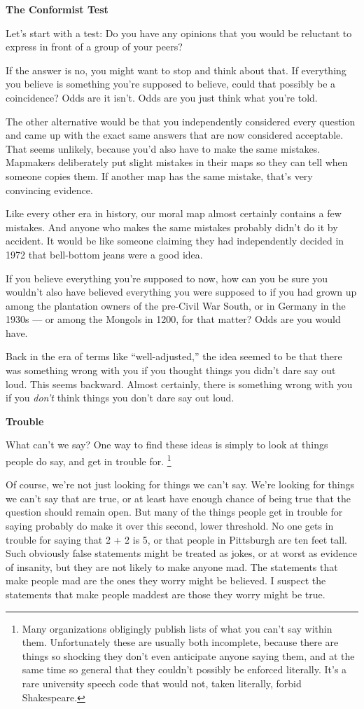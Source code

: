 \textbf{The Conformist Test}

Let's start with a test: Do you have any opinions that you would be
reluctant to express in front of a group of your peers?

If the answer is no, you might want to stop and think about that. If
everything you believe is something you're supposed to believe, could
that possibly be a coincidence? Odds are it isn't. Odds are you just
think what you're told.

The other alternative would be that you independently considered every
question and came up with the exact same answers that are now considered
acceptable. That seems unlikely, because you'd also have to make the
same mistakes. Mapmakers deliberately put slight mistakes in their maps
so they can tell when someone copies them. If another map has the same
mistake, that's very convincing evidence.

Like every other era in history, our moral map almost certainly contains
a few mistakes. And anyone who makes the same mistakes probably didn't
do it by accident. It would be like someone claiming they had
independently decided in 1972 that bell-bottom jeans were a good idea.

If you believe everything you're supposed to now, how can you be sure
you wouldn't also have believed everything you were supposed to if you
had grown up among the plantation owners of the pre-Civil War South, or
in Germany in the 1930s --- or among the Mongols in 1200, for that
matter? Odds are you would have.

Back in the era of terms like ``well-adjusted,'' the idea seemed to be
that there was something wrong with you if you thought things you didn't
dare say out loud. This seems backward. Almost certainly, there is
something wrong with you if you \emph{don't} think things you don't dare
say out loud.

\textbf{Trouble}

What can't we say? One way to find these ideas is simply to look at
things people do say, and get in trouble for. \footnote{Many organizations obligingly publish lists of what you can't
say within them. Unfortunately these are usually both incomplete,
because there are things so shocking they don't even anticipate anyone
saying them, and at the same time so general that they couldn't possibly
be enforced literally. It's a rare university speech code that would
not, taken literally, forbid Shakespeare.}

Of course, we're not just looking for things we can't say. We're looking
for things we can't say that are true, or at least have enough chance of
being true that the question should remain open. But many of the things
people get in trouble for saying probably do make it over this second,
lower threshold. No one gets in trouble for saying that 2 + 2 is 5, or
that people in Pittsburgh are ten feet tall. Such obviously false
statements might be treated as jokes, or at worst as evidence of
insanity, but they are not likely to make anyone mad. The statements
that make people mad are the ones they worry might be believed. I
suspect the statements that make people maddest are those they worry
might be true.


